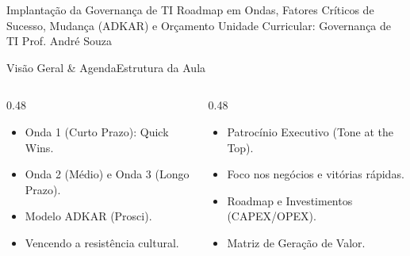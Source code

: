 
\senaicover
  {Implantação da Governança de TI}
  {Roadmap em Ondas, Fatores Críticos de Sucesso, Mudança (ADKAR) e Orçamento}
  {Unidade Curricular: Governança de TI}
  {Prof. André Souza}

\begin{senaiframe}{Visão Geral \& Agenda}{Estrutura da Aula}
  \begin{columns}[t]
    \begin{column}{0.48\textwidth}
      \begin{tcolorbox}[senaibluecard, title={1. Roadmap em Ondas}]
        \begin{itemize}
          \item Onda 1 (Curto Prazo): Quick Wins.
          \item Onda 2 (Médio) e Onda 3 (Longo Prazo).
        \end{itemize}
      \end{tcolorbox}
      \vspace{4pt}
      \begin{tcolorbox}[senaiambercard, title={3. Gestão da Mudança}]
        \begin{itemize}
          \item Modelo ADKAR (Prosci).
          \item Vencendo a resistência cultural.
        \end{itemize}
      \end{tcolorbox}
    \end{column}
    \begin{column}{0.48\textwidth}
      \begin{tcolorbox}[senairedcard, title={2. Fatores Críticos}]
        \begin{itemize}
          \item Patrocínio Executivo (Tone at the Top).
          \item Foco nos negócios e vitórias rápidas.
        \end{itemize}
      \end{tcolorbox}
      \vspace{4pt}
      \begin{tcolorbox}[senaigreencard, title={4. Capítulo 9 do PDGTI}]
        \begin{itemize}
          \item Roadmap e Investimentos (CAPEX/OPEX).
          \item Matriz de Geração de Valor.
        \end{itemize}
      \end{tcolorbox}
    \end{column}
  \end{columns}
\end{senaiframe}

